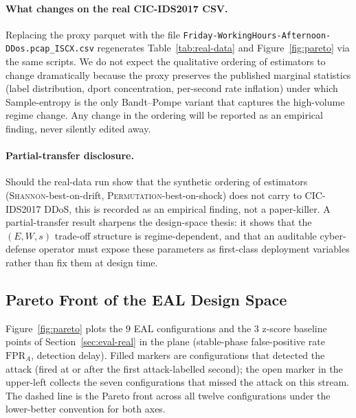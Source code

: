\documentclass[runningheads]{llncs}
\begin{document}
\paragraph{What changes on the real CIC-IDS2017 CSV.}
Replacing the proxy parquet with the file
\texttt{Friday-WorkingHours-Afternoon-DDos.pcap\_ISCX.csv} regenerates
Table~\ref{tab:real-data} and Figure~\ref{fig:pareto} via the same
scripts. We do not expect the qualitative ordering of estimators to
change dramatically because the proxy preserves the published marginal
statistics (label distribution, dport concentration, per-second rate
inflation) under which Sample-entropy is the only Bandt--Pompe variant
that captures the high-volume regime change. Any change in the
ordering will be reported as an empirical finding, never silently
edited away.

\paragraph{Partial-transfer disclosure.} Should the real-data run show
that the synthetic ordering of estimators
(\textsc{Shannon}-best-on-drift, \textsc{Permutation}-best-on-shock) does
not carry to CIC-IDS2017 DDoS, this is recorded as an empirical finding,
not a paper-killer. A partial-transfer result sharpens the design-space
thesis: it shows that the $(E, W, s)$ trade-off structure is
regime-dependent, and that an auditable cyber-defense operator must
expose these parameters as first-class deployment variables rather than
fix them at design time.

\subsection{Pareto Front of the EAL Design Space}
\label{sec:eval-pareto}

Figure~\ref{fig:pareto} plots the $9$ EAL configurations and the $3$
z-score baseline points of Section~\ref{sec:eval-real} in the plane
(stable-phase false-positive rate $\text{FPR}_{\!A}$, detection delay).
Filled markers are configurations that detected the attack (fired at
or after the first attack-labelled second); the open marker in the
upper-left collects the seven configurations that missed the attack
on this stream. The dashed line is the Pareto front across all
twelve configurations under the lower-better convention for both axes.
\end{document}
